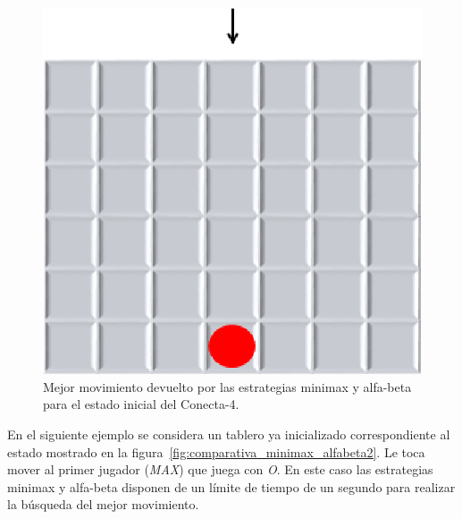 \begin{figure}[t]
	\centering
	\includegraphics[scale=0.4]{contenido/cap7/imagenes/ckEstadoInicialMovimiento.eps}
	\caption[Mejor movimiento de minimax y alfa-beta en el Conecta-4 (I)]{Mejor movimiento devuelto por las estrategias minimax y alfa-beta para el estado inicial del Conecta-4.}
	\label{fig:comparativa_minimax_alfabeta1Movimiento}
\end{figure} 

\bigskip
En el siguiente ejemplo se considera un tablero ya inicializado correspondiente al estado mostrado en la figura~\ref{fig:comparativa_minimax_alfabeta2}. 
Le toca mover al primer jugador (\textit{MAX}) que juega con \textit{O}.
En este caso las estrategias minimax y alfa-beta disponen de un límite de tiempo de un segundo para realizar la búsqueda del mejor movimiento.

